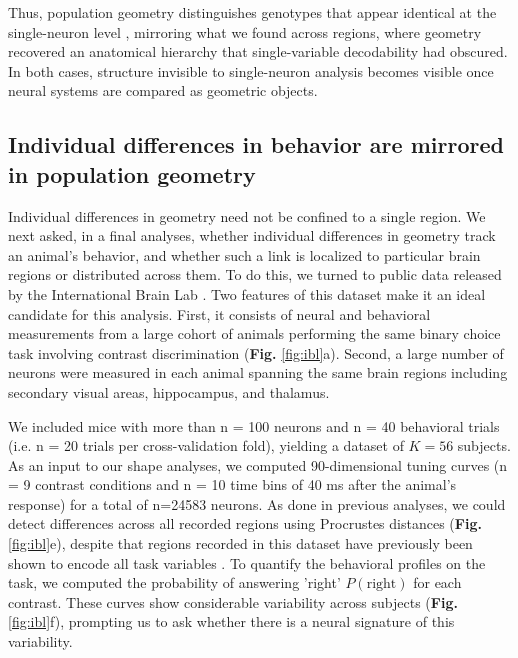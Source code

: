 Thus, population geometry distinguishes genotypes that appear identical at the single-neuron level \parencite{noel2025}, mirroring what we found across regions, where geometry recovered an anatomical hierarchy that single-variable decodability had obscured. In both cases, structure invisible to single-neuron analysis becomes visible once neural systems are compared as geometric objects.


\subsection{Individual differences in behavior are mirrored in population geometry}


Individual differences in geometry need not be confined to a single region. We next asked, in a final analyses, whether individual differences in geometry track an animal's behavior, and whether such a link is localized to particular brain regions or distributed across them.
To do this, we turned to public data released by the International Brain Lab \parencite{iblreproducibility}.
Two features of this dataset make it an ideal candidate for this analysis.
First, it consists of neural and behavioral measurements from a large cohort of animals performing the same binary choice task involving contrast discrimination (\textbf{Fig. }\ref{fig:ibl}a).
Second, a large number of neurons were measured in each animal spanning the same brain regions including secondary visual areas, hippocampus, and thalamus.

We included mice with more than n = 100 neurons and n = 40 behavioral trials (i.e. n = 20 trials per cross-validation fold), yielding a dataset of $K= 56$ subjects. As an input to our shape analyses, we computed 90-dimensional tuning curves (n = 9 contrast conditions and n = 10 time bins of 40 ms after the animal's response) for a total of n=24583 neurons. As done in previous analyses, we could detect differences across all recorded regions using Procrustes distances (\textbf{Fig.} \ref{fig:ibl}e), despite that regions recorded in this dataset have previously been shown to encode all task variables \parencite{iblreproducibility}.
To quantify the behavioral profiles on the task, we computed the probability of answering 'right' $P(\text{right})$ for each contrast.
These curves show considerable variability across subjects (\textbf{Fig.} \ref{fig:ibl}f), prompting us to ask whether there is a neural signature of this variability.

